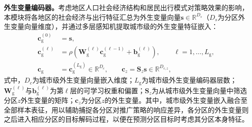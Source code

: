 \textbf{外生变量编码器。}考虑地区人口社会经济结构和居民出行模式对策略效果的影响，本模块将各地区的社会经济与出行特征汇总为外生变量向量$\bm{s}\in\mathbb{R}^{D_s}$（$D_s$为分区外生变量向量维度），并通过多层感知机提取城市级的外生变量特征嵌入：
\begin{equation}
\begin{aligned}
\bm{c}_{\mathrm{g}}^{(0)}&=\bm{s},\\
\bm{c}_{\mathrm{g}}^{(\ell)}
&=\rho\left(
\bm{W}_{\mathrm{g}}^{(\ell)}
\bm{c}_{\mathrm{g}}^{(\ell-1)}
+\bm{b}_{\mathrm{g}}^{(\ell)}
\right),
\qquad \ell=1,\ldots,L_{\mathrm{g}},\\
\bm{c}_{\mathrm{g}}
&=\bm{c}_{\mathrm{g}}^{(L_{\mathrm{g}})}
\in\mathbb{R}^{D_c},
\qquad
\bm{c}_{z}=\bm{S}_{z}\bm{s}\in\mathbb{R}^{D_{c,z}},
\end{aligned}
\label{eq.opt.condition}
\end{equation}
式中，$D_c$为城市级外生变量向量嵌入维度；$L_{\mathrm{g}}$为城市级外生变量编码器层数；$\bm{W}_{\mathrm{g}}^{(\ell)}$与$\bm{b}_{\mathrm{g}}^{(\ell)}$为第$\ell$层的可学习权重和偏置；$\bm{S}_{z}$为从城市级外生变量向量中筛选分区$z$外生变量的矩阵；$\bm{c}_{z}$为分区$z$的外生变量。其中，城市级外生变量嵌入融合至全部样本表征，用以辅助捕捉各分区对推广策略的响应差异，各分区的外生变量则之后进入相应分区的目标解码过程，以便在预测分区目标时考虑其分区本身特征。

